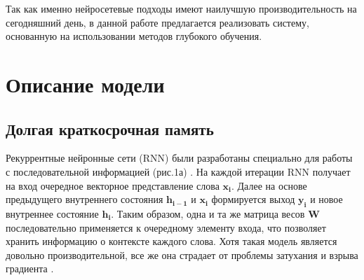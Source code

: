 \documentclass[12pt, a4paper]{article} %
\begin{document}
Так как именно нейросетевые подходы имеют наилучшую производительность на сегодняшний день, в данной работе предлагается реализовать систему, основанную на использовании методов глубокого обучения.




\newpage
\section{Описание модели}
\subsection{Долгая краткосрочная память}
Рекуррентные нейронные сети (RNN) были разработаны специально для работы с последовательной информацией (рис.1а) \cite{DBLP:journals/corr/LampleBSKD16}. На каждой итерации RNN получает на вход очередное векторное представление слова $\mathbf{x_{i}}$. Далее на основе предыдущего внутреннего состояния $\mathbf{h_{i-1}}$ и $\mathbf{x_{i}}$ формируется выход $\mathbf{y_{i}}$ и новое внутреннее состояние $\mathbf{h_{i}}$. Таким образом, одна и та же матрица весов $\mathbf{W}$ последовательно применяется к очередному элементу входа, что позволяет хранить информацию о контексте каждого слова. Хотя такая модель является довольно производительной, все же она страдает от проблемы затухания и взрыва градиента \cite{DBLP:journals/corr/LampleBSKD16}.	
\end{document}
